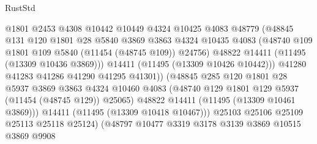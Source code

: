 \begin{lexlean}{RustStd}
\begin{coremodule}
                                  @1801
                                  @2453
                                  @4308
                                  @10442
                                  @10449
                                  @4324
                                  @10425
                                  @4083
                                  @48779
                                  (@48845
                                    @131
                                    @120
                                    @1801
                                    @28
                                    @5840
                                    @3869
                                    @3863
                                    @4324
                                    @10435
                                    @4083
                                    (@48740 @109 @1801 @109 @5840 (@11454 (@48745 @109)) @24756)
                                    @48822
                                    @14411
                                    (@11495 (@13309 @10436 @3869)))
                                  @14411
                                  (@11495 (@13309 @10426 @10442)))
                                @41280
                                @41283
                                @41286
                                @41290
                                @41295
                                @41301))
                            (@48845
                              @285
                              @120
                              @1801
                              @28
                              @5937
                              @3869
                              @3863
                              @4324
                              @10460
                              @4083
                              (@48740 @129 @1801 @129 @5937 (@11454 (@48745 @129)) @25065)
                              @48822
                              @14411
                              (@11495 (@13309 @10461 @3869)))
                            @14411
                            (@11495 (@13309 @10418 @10467)))
                          @25103
                          @25106
                          @25109
                          @25113
                          @25118
                          @25124)
                        (@48797
                          @10477
                          @3319
                          @3178
                          @3139
                          @3869
                          @10515
                          @3869
                          @9908

\end{coremodule}
\end{lexlean}
